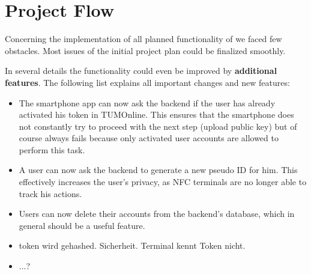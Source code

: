 \section{Project Flow}\label{sec:project_flow}

Concerning the implementation of all planned functionality of \app we faced few obstacles.
Most issues of the initial project plan could be finalized smoothly.

In several details the functionality could even be improved by \textbf{additional features}.
The following list explains all important changes and new features:
\begin{itemize}
\item The smartphone app can now ask the backend if the user has already activated his token in TUMOnline.
This ensures that the smartphone does not constantly try to proceed with the next step (upload public key) but of course always fails because only activated user accounts are allowed to perform this task.
\item A user can now ask the backend to generate a new pseudo ID for him.
This effectively increases the user's privacy, as NFC terminals are no longer able to track his actions.
\item Users can now delete their accounts from the backend's database, which in general should be a useful feature.
\item {} token wird gehashed. Sicherheit. Terminal kennt Token nicht.
\item ...?
\end{itemize}

\bigskip


